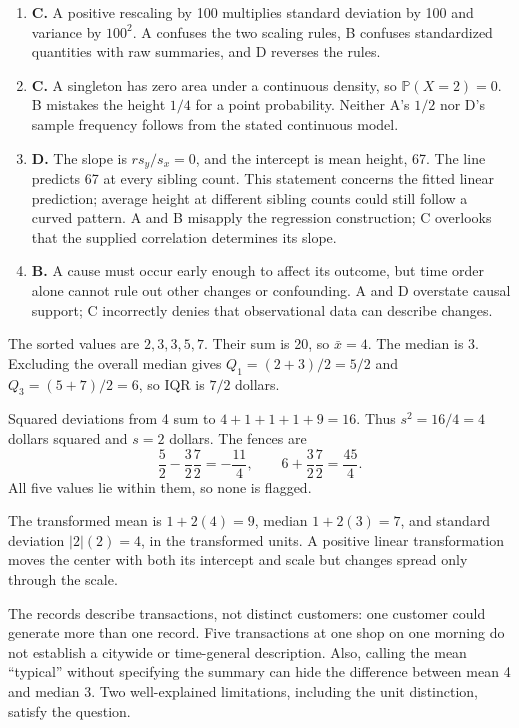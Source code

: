 \documentclass[11pt]{article}
\begin{document}
\begin{enumerate}[label=\textbf{\arabic*.}]
\item \textbf{C.} A positive rescaling by 100 multiplies standard deviation by 100 and variance by $100^2$. A confuses the two scaling rules, B confuses standardized quantities with raw summaries, and D reverses the rules.
\item \textbf{C.} A singleton has zero area under a continuous density, so $\mathbb P(X=2)=0$. B mistakes the height $1/4$ for a point probability. Neither A's $1/2$ nor D's sample frequency follows from the stated continuous model.
\item \textbf{D.} The slope is $r s_y/s_x=0$, and the intercept is mean height, 67. The line predicts 67 at every sibling count. This statement concerns the fitted linear prediction; average height at different sibling counts could still follow a curved pattern. A and B misapply the regression construction; C overlooks that the supplied correlation determines its slope.
\item \textbf{B.} A cause must occur early enough to affect its outcome, but time order alone cannot rule out other changes or confounding. A and D overstate causal support; C incorrectly denies that observational data can describe changes.
\end{enumerate}

\begin{parts}
\item The sorted values are $2,3,3,5,7$. Their sum is 20, so $\bar x=4$. The median is 3. Excluding the overall median gives $Q_1=(2+3)/2=5/2$ and $Q_3=(5+7)/2=6$, so IQR is $7/2$ dollars.
\item Squared deviations from 4 sum to $4+1+1+1+9=16$. Thus $s^2=16/4=4$ dollars squared and $s=2$ dollars. The fences are
\[\frac52-\frac32\frac72=-\frac{11}{4},\qquad 6+\frac32\frac72=\frac{45}{4}.\]
All five values lie within them, so none is flagged.
\item The transformed mean is $1+2(4)=9$, median $1+2(3)=7$, and standard deviation $|2|(2)=4$, in the transformed units. A positive linear transformation moves the center with both its intercept and scale but changes spread only through the scale.
\item The records describe transactions, not distinct customers: one customer could generate more than one record. Five transactions at one shop on one morning do not establish a citywide or time-general description. Also, calling the mean ``typical'' without specifying the summary can hide the difference between mean 4 and median 3. Two well-explained limitations, including the unit distinction, satisfy the question.
\end{parts}
\end{document}
